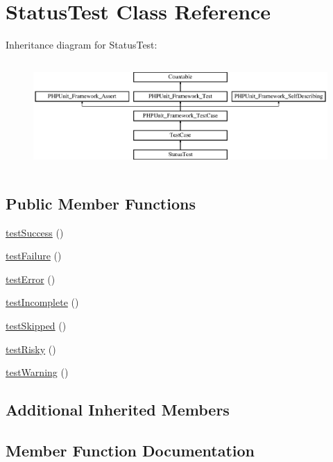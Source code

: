 \hypertarget{class_status_test}{}\section{Status\+Test Class Reference}
\label{class_status_test}
Inheritance diagram for Status\+Test\+:\begin{figure}[H]
\begin{center}
\leavevmode
\includegraphics[height=4.129793cm]{class_status_test}
\end{center}
\end{figure}
\subsection*{Public Member Functions}
\begin{DoxyCompactItemize}
\item 
\mbox{\hyperlink{class_status_test_a08a071ac504d50530175972e1a53eca9}{test\+Success}} ()
\item 
\mbox{\hyperlink{class_status_test_ab4995640dd47ccdf177deb72344da9e0}{test\+Failure}} ()
\item 
\mbox{\hyperlink{class_status_test_a1376ff8646da407fae8c31d8fb67eb13}{test\+Error}} ()
\item 
\mbox{\hyperlink{class_status_test_a5c46571a4bc9b8ca1d821a760e81654b}{test\+Incomplete}} ()
\item 
\mbox{\hyperlink{class_status_test_a25f2d4be2849dc629109816db8bf4e01}{test\+Skipped}} ()
\item 
\mbox{\hyperlink{class_status_test_aa77a8151c2ae8ad33caa82e74de98297}{test\+Risky}} ()
\item 
\mbox{\hyperlink{class_status_test_ab3d769bb4c6d720587b0ed0256641a59}{test\+Warning}} ()
\end{DoxyCompactItemize}
\subsection*{Additional Inherited Members}


\subsection{Member Function Documentation}
\mbox{\label{class_status_test_a1376ff8646da407fae8c31d8fb67eb13}} 
